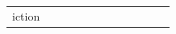\documentclass[conference]{IEEEtran}
\begin{document}
\begin{figure}
\begin{center}
\begin{tabular}{| x{1.11cm} | x{.75cm} | x{.75cm} || x{1.11cm} | x{.75cm} | x{.75cm} || x{1.11cm} | x{.75cm} | x{.75cm} || x{1.11cm} | x{.75cm} | x{.75cm} |}
iction
\end{tabular}
\end{center}
\end{figure}
\end{document}
